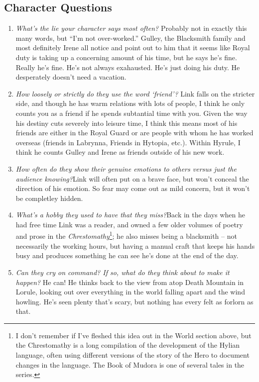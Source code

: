   \subsection{Character Questions}
  \begin{enumerate}
    \item\textit{What’s the lie your character says most often?} Probably not in exactly this many words, but ``I'm not over-worked.''  Gulley, the Blacksmith family and most definitely Irene all notice and point out to him that it seems like Royal duty is taking up a concerning amount of his time, but he says he's fine. Really he's fine. He's not always exahausted. He's just doing his duty. He desperately doesn't need a vacation.
    \item\textit{How loosely or strictly do they use the word ‘friend’?} Link falls on the stricter side, and though he has warm relations with lots of people, I think he only counts you as a friend if he spends subtantial time with you. Given the way his destiny cuts severely into leisure time, I think this means most of his friends are either in the Royal Guard or are people with whom he has worked overseas (friends in Labrynna, Friends in Hytopia, etc.). Within Hyrule, I think he counts Gulley and Irene as friends outside of his new work.
    \item\textit{How often do they show their genuine emotions to others versus just the audience knowing?}Link will often put on a brave face, but won't conceal the direction of his emotion. So fear may come out as mild concern, but it won't be completley hidden. 
    \item\textit{What’s a hobby they used to have that they miss?}Back in the days when he had free time Link was a reader, and owned a few older volumes of poetry and prose in the \emph{Chrestomathy}\footnote{I don't remember if I've fleshed this idea out in the World section above, but the Chrestomathy is a long compilation of the development of the Hylian language, often using different versions of the story of the Hero to document changes in the language. The Book of Mudora is one of several tales in the series.}; he also misses being a blacksmith -- not necessarily the working hours, but having a manual craft that keeps his hands busy and produces something he can see he's done at the end of the day.
    \item\textit{Can they cry on command? If so, what do they think about to make it happen?} He can! He thinks back to the view from atop Death Mountain in Lorule, looking out over everything in the world falling apart and the wind howling. He's seen plenty that's scary, but nothing has every felt as forlorn as that.

\end{enumerate}
